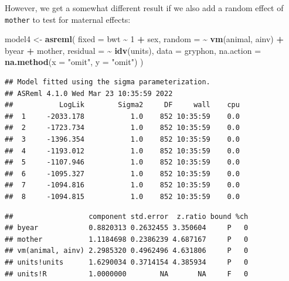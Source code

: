 \documentclass[
  12pt,
]{book}
\newenvironment{Shaded}{\begin{snugshade}}{\end{snugshade}}
\newcommand{\DataTypeTok}[1]{\textcolor[rgb]{0.13,0.29,0.53}{#1}}
\newcommand{\DecValTok}[1]{\textcolor[rgb]{0.00,0.00,0.81}{#1}}
\newcommand{\KeywordTok}[1]{\textcolor[rgb]{0.13,0.29,0.53}{\textbf{#1}}}
\newcommand{\NormalTok}[1]{#1}
\newcommand{\OperatorTok}[1]{\textcolor[rgb]{0.81,0.36,0.00}{\textbf{#1}}}
\newcommand{\StringTok}[1]{\textcolor[rgb]{0.31,0.60,0.02}{#1}}
\begin{document}
However, we get a somewhat different result if we also add a random effect of \texttt{mother} to test for maternal effects:

\begin{Shaded}
\begin{Highlighting}[]
\NormalTok{model4 \textless{}{-}}\StringTok{ }\KeywordTok{asreml}\NormalTok{(}
  \DataTypeTok{fixed =}\NormalTok{ bwt }\OperatorTok{\textasciitilde{}}\StringTok{ }\DecValTok{1} \OperatorTok{+}\StringTok{ }\NormalTok{sex,}
  \DataTypeTok{random =} \OperatorTok{\textasciitilde{}}\StringTok{ }\KeywordTok{vm}\NormalTok{(animal, ainv) }\OperatorTok{+}\StringTok{ }\NormalTok{byear }\OperatorTok{+}\StringTok{ }\NormalTok{mother,}
  \DataTypeTok{residual =} \OperatorTok{\textasciitilde{}}\StringTok{ }\KeywordTok{idv}\NormalTok{(units),}
  \DataTypeTok{data =}\NormalTok{ gryphon,}
  \DataTypeTok{na.action =} \KeywordTok{na.method}\NormalTok{(}\DataTypeTok{x =} \StringTok{"omit"}\NormalTok{, }\DataTypeTok{y =} \StringTok{"omit"}\NormalTok{)}
\NormalTok{)}
\end{Highlighting}
\end{Shaded}

\begin{verbatim}
## Model fitted using the sigma parameterization.
## ASReml 4.1.0 Wed Mar 23 10:35:59 2022
##           LogLik        Sigma2     DF     wall    cpu
##  1     -2033.178           1.0    852 10:35:59    0.0
##  2     -1723.734           1.0    852 10:35:59    0.0
##  3     -1396.354           1.0    852 10:35:59    0.0
##  4     -1193.012           1.0    852 10:35:59    0.0
##  5     -1107.946           1.0    852 10:35:59    0.0
##  6     -1095.327           1.0    852 10:35:59    0.0
##  7     -1094.816           1.0    852 10:35:59    0.0
##  8     -1094.815           1.0    852 10:35:59    0.0
\end{verbatim}

\begin{Shaded}
\end{Shaded}

\begin{verbatim}
##                  component std.error  z.ratio bound %ch
## byear            0.8820313 0.2632455 3.350604     P   0
## mother           1.1184698 0.2386239 4.687167     P   0
## vm(animal, ainv) 2.2985320 0.4962496 4.631806     P   0
## units!units      1.6290034 0.3714154 4.385934     P   0
## units!R          1.0000000        NA       NA     F   0
\end{verbatim}
\end{document}
